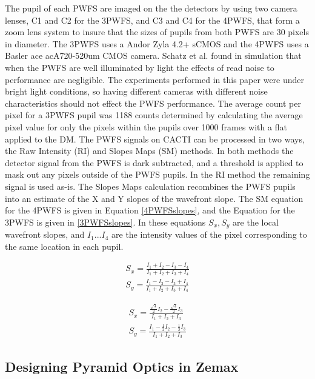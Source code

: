 The pupil of each PWFS are imaged on the the detectors by using two camera lenses, C1 and C2 for the 3PWFS, and C3 and C4 for the 4PWFS,  that form a zoom lens system to insure that the sizes of pupils from both PWFS are 30 pixels in diameter. The 3PWFS uses a Andor Zyla 4.2+ sCMOS and the 4PWFS uses a Basler ace acA720-520um CMOS camera. Schatz et al. found in simulation that when the PWFS are well illuminated by light the effects of read noise to performance are negligible. The experiments performed in this paper were under bright light conditions, so having different cameras with different noise characteristics should not effect the PWFS performance. The average count per pixel for a 3PWFS pupil was 1188 counts determined by calculating the average pixel value for only the pixels within the pupils over 1000 frames with a flat applied to the DM. The PWFS signals on CACTI can be processed in two ways, the Raw Intensity (RI) and Slopes Maps (SM) methods. In both methods the detector signal from the PWFS is dark subtracted, and a threshold is applied to mask out any pixels outside of the PWFS pupils. In the RI method the remaining signal is used as-is. The Slopes Maps calculation recombines the PWFS pupils into an estimate of the X and Y slopes of the wavefront slope. The SM equation for the 4PWFS is given in Equation \ref{4PWFSslopes}, and the Equation for the 3PWFS is given in \ref{3PWFSslopes}. In these equations $S_x, S_y$ are the local wavefront slopes, and $I_1...I_4$ are the intensity values of the pixel corresponding to the same location in each pupil.


\begin{eqnarray}
    S_x=\frac{I_1+I_2-I_3-I_4}{I_1+I_2+I_3+I_4}     \label{4PWFSslopes} \\
    S_y=\frac{I_1-I_2-I_3+I_4}{I_1+I_2+I_3+I_4} \nonumber
\end{eqnarray}

\begin{eqnarray}
    S_x=\frac{\frac{\sqrt{3}}{2}I_2-\frac{\sqrt{3}}{2}I_3}{I_1+I_2+I_3} \label{3PWFSslopes} \\
    S_y=\frac{I_1-\frac{1}{2}I_2-\frac{1}{2}I_3}{I_1+I_2+I_3} \nonumber
\end{eqnarray}


\subsection{Designing Pyramid Optics in Zemax}

